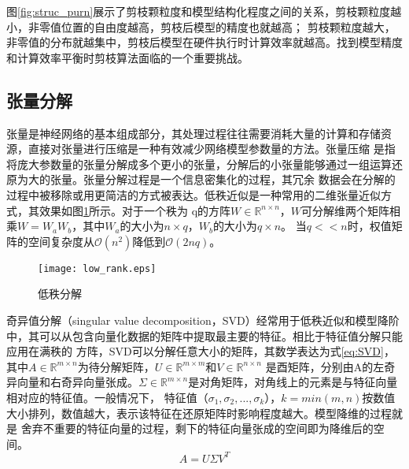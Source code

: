 图\ref{fig:struc_purn}展示了剪枝颗粒度和模型结构化程度之间的关系，剪枝颗粒度越小，非零值位置的自由度越高，剪枝后模型的精度也就越高；
剪枝颗粒度越大，非零值的分布就越集中，剪枝后模型在硬件执行时计算效率就越高。找到模型精度和计算效率平衡时剪枝算法面临的一个重要挑战。


\subsection{张量分解}
张量是神经网络的基本组成部分，其处理过程往往需要消耗大量的计算和存储资源，直接对张量进行压缩是一种有效减少网络模型参数量的方法。张量压缩
是指将庞大参数量的张量分解成多个更小的张量，分解后的小张量能够通过一组运算还原为大的张量。张量分解过程是一个信息密集化的过程，其冗余
数据会在分解的过程中被移除或用更简洁的方式被表达。低秩近似是一种常用的二维张量近似方式，其效果如图\ref{fig:lowrank}所示。对于一个秩为
q的方阵\(W \in \mathbb{R}^{n \times n}\)，\(W\)可分解维两个矩阵相乘\(W = W_a  W_b\)，其中\(W_a\)的大小为\(n \times q\)，\(W_b\)的大小为\(q \times n\)。
当\(q << n \)时，权值矩阵的空间复杂度从\(\mathcal{O}(n^2)\)降低到\(\mathcal{O}(2nq)\)。
\begin{figure}
	\centering
	\texttt{[image: low\_rank.eps]}
	\caption{低秩分解}
	\label{fig:lowrank}
\end{figure}

奇异值分解（singular value decomposition，SVD）经常用于低秩近似和模型降阶中，其可以从包含向量化数据的矩阵中提取最主要的特征。相比于特征值分解只能应用在满秩的
方阵，SVD可以分解任意大小的矩阵，其数学表达为式\ref{eq:SVD}，其中\(A \in \mathbb{R}^{m \times n}\)为待分解矩阵，\( U \in \mathbb{R}^{m \times m}\)和\( V \in \mathbb{R}^{n \times n}\)
是酉矩阵，分别由A的左奇异向量和右奇异向量张成。\(\Sigma \in \mathbb{R}^{m \times n}\)是对角矩阵，对角线上的元素是与特征向量相对应的特征值。一般情况下，
特征值（\(\sigma_1, \sigma_2,...,\sigma_k\)），\(k=min(m,n)\)按数值大小排列，数值越大，表示该特征在还原矩阵时影响程度越大。模型降维的过程就是
舍弃不重要的特征向量的过程，剩下的特征向量张成的空间即为降维后的空间。
\begin{equation}\label{eq:SVD}
	A = U  \Sigma   V^T
\end{equation}

